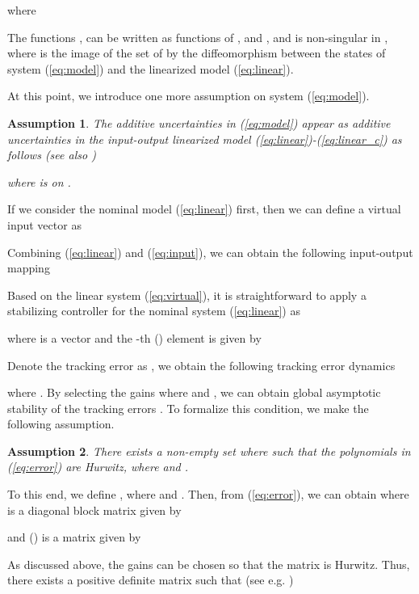 \documentclass[twoside,leqno,onecolumn]{article}
\newtheorem{assumption}{Assumption}
\begin{document}
where

The functions ,  can be written as functions of
,  and , and  is non-singular in ,
where  is the image of the set of  by the
diffeomorphism  between the states of system
(\ref{eq:model}) and the linearized model (\ref{eq:linear}).

At this point, we introduce one more assumption on system
(\ref{eq:model}).

\begin{assumption}
The additive uncertainties  in (\ref{eq:model})
appear as additive uncertainties in the input-output linearized
model (\ref{eq:linear})-(\ref{eq:linear_c}) as follows (see also
\cite{Beno09})

where  is  on .
\end{assumption}

If we consider the nominal model (\ref{eq:linear}) first, then we
can define a virtual input vector  as

Combining (\ref{eq:linear}) and (\ref{eq:input}), we can obtain
the following input-output mapping

Based on the linear system (\ref{eq:virtual}), it is
straightforward to apply a stabilizing controller for the nominal
system (\ref{eq:linear}) as

where  is a  vector and the -th () element  is given by

Denote the tracking error as , we obtain  the following tracking error dynamics

where . By selecting the gains 
where  and ,
we can obtain global asymptotic stability of the tracking errors
. To formalize this condition, we make the following
assumption.

\begin{assumption}
There exists a non-empty set  where
 such that the polynomials in
(\ref{eq:error}) are Hurwitz, where 
and .
\end{assumption}



To this end, we define , where
 and
. Then, from (\ref{eq:error}), we can
obtain
where  is a diagonal block
matrix given by

and  () is a  matrix
given by

As discussed above, the gains  can be chosen so that the
matrix  is Hurwitz. Thus, there exists a positive
definite matrix  such that (see e.g. \cite{Khalil02})
 
\end{document}
